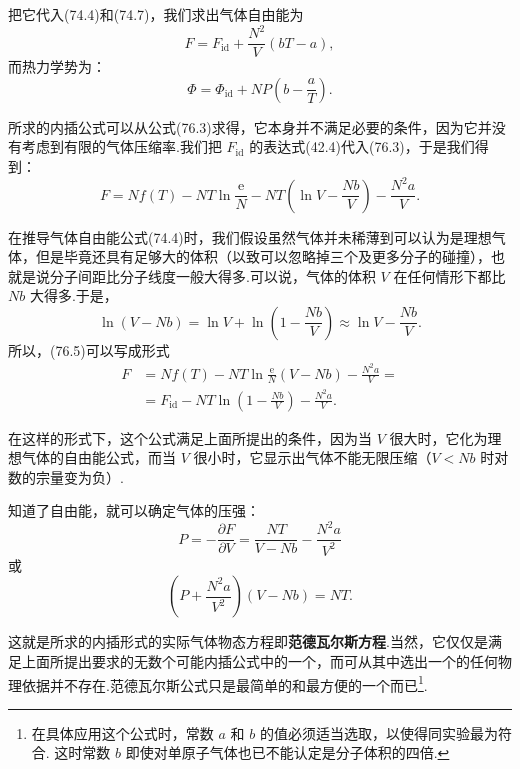 把它代入(74.4)和(74.7)，我们求出气体自由能为
\begin{equation}
  F=F_{\mathrm{id}}+\frac{N^2}{V}(bT-a),
\end{equation}
而热力学势为：
\begin{equation}
  \varPhi=\varPhi_{\mathrm{id}}+NP\left(b-\frac{a}{T}\right).
\end{equation}

所求的内插公式可以从公式(76.3)求得，它本身并不满足必要的条件，因为它并没有考虑到有限的气体压缩率.我们把 $F_{\mathrm{id}}$ 的表达式(42.4)代入(76.3)，于是我们得到：
\begin{equation}
  F=Nf(T)-NT\ln\frac{\mathrm{e}}{N}
  -NT\left(\ln V-\frac{Nb}{V}\right)-\frac{N^2a}{V}.
\end{equation}

在推导气体自由能公式(74.4)时，我们假设虽然气体并未稀薄到可以认为是理想气体，但是毕竟还具有足够大的体积（以致可以忽略掉三个及更多分子的碰撞），也就是说分子间距比分子线度一般大得多.可以说，气体的体积 $V$ 在任何情形下都比 $Nb$ 大得多.于是，
\begin{equation*}
  \ln(V-Nb)=\ln V+\ln\left(1-\frac{Nb}{V}\right)\approx\ln V-\frac{Nb}{V}.
\end{equation*}
所以，(76.5)可以写成形式
\begin{equation}
\begin{aligned}
  F&=Nf(T)-NT\ln\frac{\mathrm{e}}{N}(V-Nb)-\frac{N^2a}{V}=\\
  &=F_{\mathrm{id}}-NT\ln\left(1-\frac{Nb}{V}\right)-\frac{N^2a}{V}.
\end{aligned}
\end{equation}

在这样的形式下，这个公式满足上面所提出的条件，因为当 $V$ 很大时，它化为理想气体的自由能公式，而当 $V$ 很小时，它显示出气体不能无限压缩（$V<Nb$ 时对数的宗量变为负）.

知道了自由能，就可以确定气体的压强：
\begin{equation*}
  P=-\frac{\partial F}{\partial V}=\frac{NT}{V-Nb}-\frac{N^2a}{V^2}
\end{equation*}
或
\begin{equation}
  \left(P+\frac{N^2a}{V^2}\right)(V-Nb)=NT.
\end{equation}

这就是所求的内插形式的实际气体物态方程即\textbf{范德瓦尔斯方程}.当然，它仅仅是满足上面所提出要求的无数个可能内插公式中的一个，而可从其中选出一个的任何物理依据并不存在.范德瓦尔斯公式只是最简单的和最方便的一个而已\footnote{在具体应用这个公式时，常数 $a$ 和 $b$ 的值必须适当选取，以使得同实验最为符合. 这时常数 $b$ 即使对单原子气体也已不能认定是分子体积的四倍.}.


